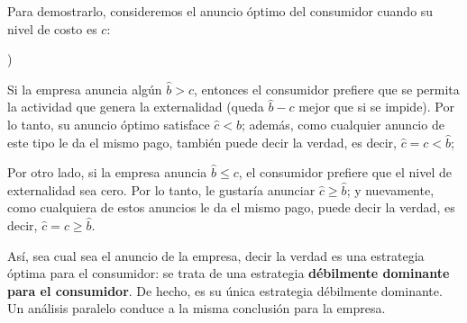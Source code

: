 \documentclass[10pt,a4paper]{article}
\newcounter{alphaitem}
\newenvironment{la}
      {\begin{list}{\alph{alphaitem})}{%
          \usecounter{alphaitem}%
          \setlength{\leftmargin}{1cm}%
          \setlength{\parskip}{3pt}%
          \setlength{\itemsep}{0pt}%
          \setlength{\parsep}{0pt}%
      }}
      {\end{list}}
\begin{document}
Para demostrarlo, consideremos el anuncio óptimo del consumidor cuando su nivel de costo es $c$:
\begin{la}
    \item Si la empresa anuncia algún $\hat b > c$, entonces el consumidor prefiere que se permita la actividad que genera la externalidad (queda $\hat b-c$ mejor que si se impide). Por lo tanto, su anuncio óptimo satisface $\hat c<\hat b$; además, como cualquier anuncio de este tipo le da el mismo pago, también puede decir la verdad, es decir, $\hat c=c<\hat b$;
    \item Por otro lado, si la empresa anuncia $\hat b\leq c$, el consumidor prefiere que el nivel de externalidad sea cero. Por lo tanto, le gustaría anunciar $\hat c\geq \hat b$; y nuevamente, como cualquiera de estos anuncios le da el mismo pago, puede decir la verdad, es decir, $\hat c=c\geq \hat b$. 
\end{la}

Así, sea cual sea el anuncio de la empresa, decir la verdad es una estrategia óptima para el consumidor: se trata de una estrategia \textbf{débilmente dominante para el consumidor}. De hecho, es su única estrategia débilmente dominante. Un análisis paralelo conduce a la misma conclusión para la empresa.
\end{document}
